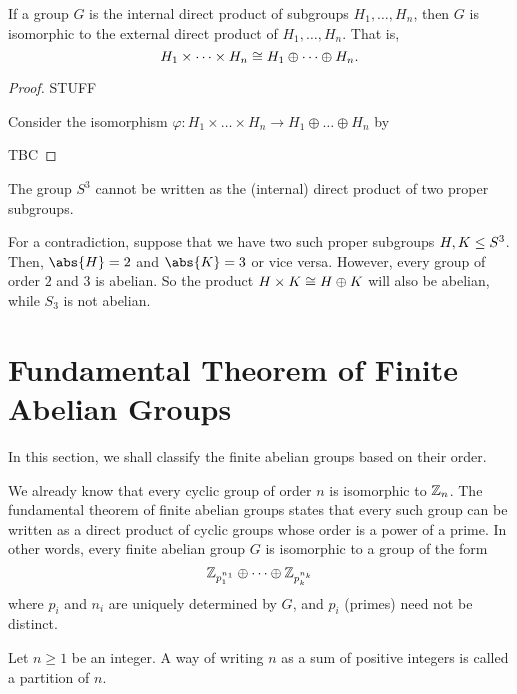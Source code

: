 \documentclass[11pt]{penrose}
\begin{document}

\begin{nthm}
    If a group $G$ is the internal direct product of subgroups $H_{1}, \dots, H_{n}$, then $G$ is isomorphic to the external direct product of $H_{1}, \dots, H_{n}$. That is,
    \begin{equation*}
        H_{1} \times \dots \times H_{n} \mathrel{\cong} H_{1} \oplus \dots \oplus H_{n}.
    \end{equation*}
\end{nthm}
\begin{proof}
    STUFF

    Consider the isomorphism $\varphi : H_{1} \times \dots \times H_{n} \to H_{1} \oplus \dots \oplus H_{n}$ by        

    TBC
\end{proof}

\begin{negg}
    The group $S^{3}$ cannot be written as the (internal) direct product of two proper subgroups.

    For a contradiction, suppose that we have two such proper subgroups $H, K \mathrel{\leq} S^{3}$. Then, $\abs{H} = 2$ and $\abs{K} = 3$ or vice versa. However, every group of order $2$ and $3$ is abelian. So the product $H \times K \mathrel{\cong} H \oplus K$ will also be abelian, while $S_{3}$ is not abelian. \eggqed
\end{negg}

\section{Fundamental Theorem of Finite Abelian Groups}
In this section, we shall classify the finite abelian groups based on their order.

We already know that every cyclic group of order $n$ is isomorphic to $\mathbb{Z}_{n}$. The fundamental theorem of finite abelian groups states that every such group can be written as a direct product of cyclic groups whose order is a power of a prime. In other words, every finite abelian group $G$ is isomorphic to a group of the form
\begin{equation*}
    \mathbb{Z}_{p_{1}^{n_{1}}} \oplus \dots \oplus \mathbb{Z}_{p_{k}^{n_{k}}}
\end{equation*}
where $p_{i}$ and $n_{i}$ are uniquely determined by $G$, and $p_{i}$ (primes) need not be distinct.

\begin{ndfn}
    Let $n \geq 1$ be an integer. A way of writing $n$ as a sum of positive integers is called a partition of $n$.
\end{ndfn}
\end{document}
